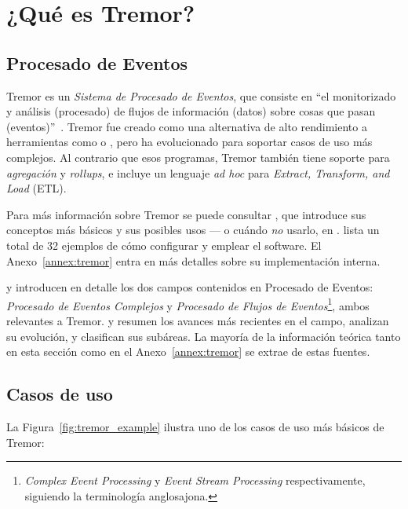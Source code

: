 
\chapter{¿Qué es Tremor?}\label{ch:tremor}

\section{Procesado de Eventos}

Tremor es un \emph{Sistema de Procesado de Eventos}, que consiste en ``el
monitorizado y análisis (procesado) de flujos de información (datos) sobre cosas
que pasan (eventos)''~\cite{luckham2011event}. Tremor fue creado como una
alternativa de alto rendimiento a herramientas como \textcite{logstash} o
\textcite{telegraf}, pero ha evolucionado para soportar casos de uso más
complejos. Al contrario que esos programas, Tremor también tiene soporte para
\emph{agregación} y \emph{rollups}, e incluye un lenguaje \emph{ad hoc} para
\emph{Extract, Transform, and Load} (ETL).

Para más información sobre Tremor se puede consultar \textcite{tremorintro}, que
introduce sus conceptos más básicos y sus posibles usos --- o cuándo \emph{no}
usarlo, en \textcite{tremorconstraints}. \textcite{tremorrecipes} lista un total
de 32 ejemplos de cómo configurar y emplear el software. El
Anexo~\ref{annex:tremor} entra en más detalles sobre su implementación interna.

\textcite{robins2010complex} y \textcite{cugola2012processing} introducen en
detalle los dos campos contenidos en Procesado de Eventos: \emph{Procesado de
Eventos Complejos} y \emph{Procesado de Flujos de
Eventos}\footnote{\emph{Complex Event Processing} y \emph{Event Stream
Processing} respectivamente, siguiendo la terminología anglosajona.}, ambos
relevantes a Tremor. \textcite{dayarathna2018recent} y
\textcite{tawsif2018review} resumen los avances más recientes en el campo,
analizan su evolución, y clasifican sus subáreas. La mayoría de la información
teórica tanto en esta sección como en el Anexo~\ref{annex:tremor} se extrae de
estas fuentes.

\section{Casos de uso}

La Figura~\ref{fig:tremor_example} ilustra uno de los casos de uso más básicos
de Tremor:

